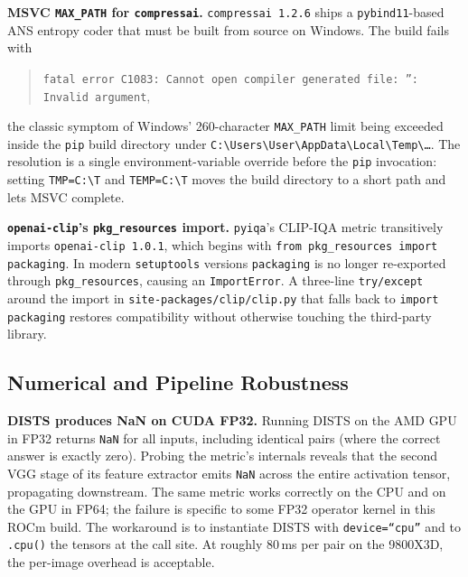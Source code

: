 \documentclass[conference]{IEEEtran}
\begin{document}
\textbf{MSVC \texttt{MAX\_PATH} for \texttt{compressai}.}
\texttt{compressai 1.2.6} ships a \texttt{pybind11}-based ANS entropy coder
that must be built from source on Windows. The build fails with
\begin{quote}
\small\texttt{fatal error C1083: Cannot open compiler generated file: '': Invalid argument},
\end{quote}
the classic symptom of Windows' 260-character \texttt{MAX\_PATH} limit being
exceeded inside the \texttt{pip} build directory under
\texttt{C:{\textbackslash}Users{\textbackslash}User{\textbackslash}AppData{\textbackslash}Local{\textbackslash}Temp{\textbackslash}\ldots}.
The resolution is a single environment-variable override before the
\texttt{pip} invocation: setting \texttt{TMP=C:{\textbackslash}T} and
\texttt{TEMP=C:{\textbackslash}T} moves the build directory to a short
path and lets MSVC complete.

\textbf{\texttt{openai-clip}'s \texttt{pkg\_resources} import.}
\texttt{pyiqa}'s CLIP-IQA metric transitively imports
\texttt{openai-clip 1.0.1}, which begins with
\texttt{from pkg\_resources import packaging}. In modern
\texttt{setuptools} versions \texttt{packaging} is no longer re-exported
through \texttt{pkg\_resources}, causing an \texttt{ImportError}. A
three-line \texttt{try/except} around the import in
\texttt{site-packages/clip/clip.py} that falls back to
\texttt{import packaging} restores compatibility without otherwise touching
the third-party library.

\subsection{Numerical and Pipeline Robustness}

\textbf{DISTS produces NaN on CUDA FP32.} Running DISTS on the AMD GPU in
FP32 returns \texttt{NaN} for all inputs, including identical pairs (where
the correct answer is exactly zero). Probing the metric's internals
reveals that the second VGG stage of its feature extractor emits
\texttt{NaN} across the entire activation tensor, propagating downstream.
The same metric works correctly on the CPU and on the GPU in FP64; the
failure is specific to some FP32 operator kernel in this ROCm build. The
workaround is to instantiate DISTS with \texttt{device=``cpu''} and to
\texttt{.cpu()} the tensors at the call site. At roughly 80\,ms per pair
on the 9800X3D, the per-image overhead is acceptable.
\end{document}
